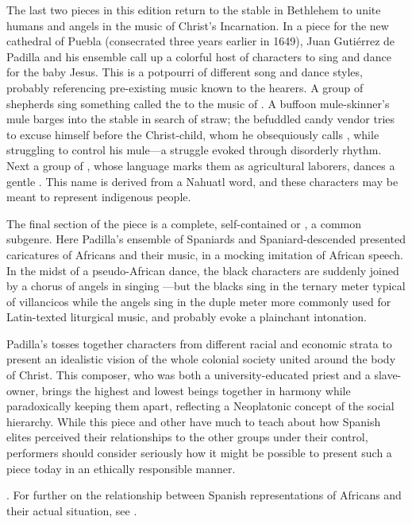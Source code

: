 The last two pieces in this edition return to the stable in Bethlehem to unite 
humans and angels in the music of Christ's Incarnation.
In a piece for the new cathedral of Puebla (consecrated three years earlier in 
1649), Juan Gutiérrez de Padilla and his ensemble call up a colorful host of
characters  to sing and dance for the baby
Jesus.%
    \Autocite[406--467]{Cashner:PhD}
This  is a potpourri of different song and dance styles, 
probably referencing pre-existing music known to the hearers.
A group of shepherds sing something called the  to the music 
of .
A buffoon mule-skinner's mule barges into the stable in search of straw; the 
befuddled candy vendor tries to excuse himself before the Christ-child, whom he 
obsequiously calls , while struggling to control his mule---a 
struggle evoked through disorderly rhythm.
Next a group of , whose language marks them as 
agricultural laborers, dances a gentle .
This name is derived from a Nahuatl word, and these characters may be meant to 
represent indigenous people.

The final section of the piece is a complete, self-contained  or 
, a common subgenre.
Here Padilla's ensemble of Spaniards and Spaniard-descended  
presented caricatures of Africans and their music, in a mocking imitation of 
African speech.
In the midst of a pseudo-African dance, the black characters are suddenly 
joined by a chorus of angels in singing ---but the blacks sing in 
the ternary meter typical of villancicos while the angels sing in the duple
meter more commonly used for Latin-texted liturgical music, and probably evoke a
plainchant intonation.

Padilla's  tosses together characters from different 
racial and economic strata to present an idealistic vision of the whole 
colonial society united around the body of Christ.
This composer, who was both a university-educated priest and a slave-owner,
brings the highest and lowest beings together in harmony while paradoxically
keeping them apart, reflecting a Neoplatonic concept of the social hierarchy.%
    \Autocite{Mauleon:PadillaPalafox}
While this piece and other  have much to teach 
about how Spanish elites perceived their relationships to the other groups 
under their control, performers should consider seriously how it might be 
possible to present such a piece today in an ethically responsible manner.%
  \begin{Footnote}
      \Autocites{Baker:EthnicVC}{Baker:PerformancePostColonial}. 
      For further on the relationship between Spanish representations of Africans 
      and their actual situation, see
      \autocites{Molinero:Negros}{Lipski:AfroHispanic}
      {Fromont:DancingKingCongo}.
  \end{Footnote}

